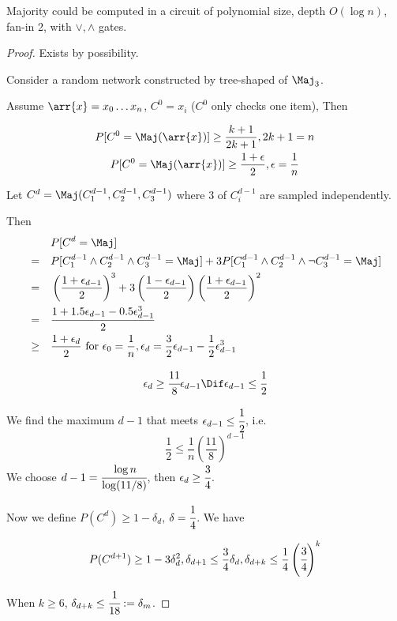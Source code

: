 \begin{theorem}[Valiant]
Majority could be computed in a circuit of polynomial size,
depth \by \(O(\log n)\), fan-in 2, with \(\lor, \land\) gates.
\end{theorem}

\begin{proof}
Exists by possibility.

Consider a random network constructed by tree-shaped of \(\Maj_3\).

Assume \(\arr{x}=x_0\dots x_n\), \(C^0=x_i\) (\(C^0\) only checks one
item), Then 

\begin{gather*}
P[C^0=\Maj(\arr{x})] \ge \frac{k+1}{2k+1}, 2k+1=n\\
P[C^0=\Maj(\arr{x})] \ge \frac{1+\epsilon}{2}, \epsilon = \frac{1}{n}  
\end{gather*}

Let \(C^d = \Maj(C^{d-1}_1, C^{d-1}_2, C^{d-1}_3)\) where 3 of \(C^{d-1}_i\)
are sampled independently.

Then
\begin{align*}
& && P[C^d = \Maj]  \\
&=&& P[C^{d-1}_1\land C^{d-1}_2\land C^{d-1}_3=\Maj] + 3P[C^{d-1}_1 \land C^{d-1}_2 \land \lnot C^{d-1}_3=\Maj]\\
&=&& \left(\frac{1+\epsilon_{d-1}}{2}\right)^3+ 3 \left(\frac{1-\epsilon_{d-1}}{2}\right)\left(\frac{1+\epsilon_{d-1}}{2}\right)^2 \\
&=&& \frac{1+1.5\epsilon_{d-1} - 0.5\epsilon_{d-1}^3}{2} \\
&\ge&& \frac{1 + \epsilon_d}{2}  \text{ for } \epsilon_0=\frac{1}{n},\epsilon_d = \frac{3}{2}\epsilon_{d-1}-\frac{1}{2}\epsilon_{d-1}^3
\end{align*}

$$\epsilon_d \ge \cfrac{11}{8}\epsilon_{d-1} \Dif \epsilon_{d-1} \le \cfrac{1}{2}$$

We find the maximum $d-1$ that meets $\epsilon_{d-1} \le \cfrac{1}{2}$, i.e.
$$\frac{1}{2} \le \frac{1}{n}\left(\frac{11}{8}\right)^{d-1}$$
We choose $d-1 = \cfrac{\log n}{\log (11/8)}$, then $\epsilon_d \ge \cfrac{3}{4}$.

Now we define $P(C^d) \ge 1-\delta_{d}$, $\delta = \cfrac{1}{4} $. We have

$$P(C^{d+1}) \ge 1-3\delta_d^2, \delta_{d+1} \le \frac{3}{4}\delta_d, \delta_{d+k} \le \frac{1}{4}\left(\cfrac{3}{4}\right)^k$$

When $k \ge 6$, $\delta_{d+k} \le \cfrac{1}{18} := \delta_{m}$.


\end{proof}
